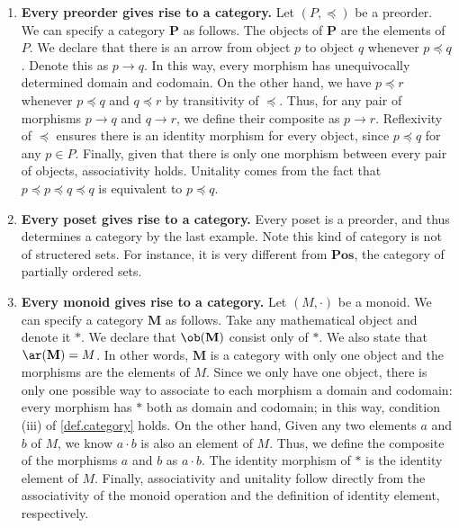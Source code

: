 \begin{example}
\begin{enumerate}[label=\arabic*.]
    \item \textbf{Every preorder gives rise to  a category.}  Let \((P, \preceq)\) be a preorder. 
    We can specify a category \(\mathbf{P}\) as follows. The objects of \(\mathbf{P}\) are the elements of \(P\).
    We declare that there is an arrow from object \(p\) to object \(q\) whenever \(p\preceq q\). Denote this as \(p\to q\).
    In this way, every morphism has unequivocally determined domain and codomain.
    On the other hand, we have  \(p\preceq r\) whenever  \(p\preceq q\) and \(q\preceq r\) by transitivity of \(\preceq\).
    Thus, for any pair of morphisms \(p\to q\) and \(q\to r\), we define their composite as \(p\to r\).
    Reflexivity of \(\preceq\) ensures there is an identity morphism for every object, since \(p\preceq q  \) for any \(p\in P\).
    Finally, given that there is only one morphism between every pair of  objects, associativity holds.
    Unitality comes from the fact that \(p\preceq p\preceq q\preceq q\) is equivalent to \(p\preceq q\).


    \item \textbf{Every poset gives rise to a category.} Every poset is a preorder, and thus determines a category by the last example. Note this kind of category is not of structered sets.
    For instance, it is very different from  \(\mathbf{Pos}\), the category of partially ordered sets. 
    
    \item \textbf{Every monoid gives rise to a category.}
    Let \(\left( M, \cdot \right)\) be a monoid.
    We can specify a category \(\mathbf{M}\) as follows.
    Take any mathematical object and  denote it \(*\).
    We declare that \(\ob(\mathbf{M})\)  consist only of \(*\).
    We also state that \(\ar({\mathbf{M}}) = M \).
    In other words, \(\mathbf{M}\) is a category with only one object and the morphisms are the elements of \(M\).
    Since we only have one object, there is only one possible way to associate to each morphism a   domain and codomain: every morphism has \(*\) both as domain and codomain; in this way, condition (iii) of \ref{def.category} holds.
    On the other hand,
    Given any two elements  \(a\) and \(b\) of \(M\), we know  \(a\cdot b\) is also an element of \(M\).
    Thus, we define the composite of the morphisms \(a\) and \(b\) as \(a\cdot b\). %
    The identity morphism of \(*\) is the identity element of \(M\).
    Finally, associativity and unitality follow directly from the associativity of the monoid operation and the definition of identity element, respectively. 
    

\end{enumerate}
\end{example}
